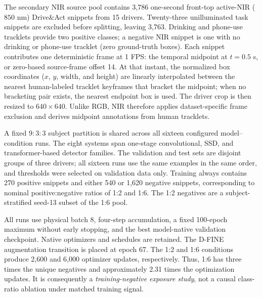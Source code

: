 \documentclass[conference]{IEEEtran}
\newcommand{\rev}[1]{{\color{blue}#1}}
\begin{document}
The secondary NIR source pool contains 3,786 one-second front-top active-NIR ($850$ nm) Drive\&Act snippets from 15 drivers. Twenty-three unilluminated task snippets are excluded before splitting, leaving 3,763. Drinking and phone-use tracklets provide two positive classes; \rev{a negative NIR snippet is one with no drinking or phone-use tracklet (zero ground-truth boxes)}. Each snippet contributes one deterministic frame at 1 FPS: the temporal midpoint at $t=0.5$ s, or zero-based source-frame offset 14. At that instant, the normalized box coordinates ($x$, $y$, width, and height) are linearly interpolated between the nearest human-labeled tracklet keyframes that bracket the midpoint; when no bracketing pair exists, the nearest endpoint box is used. The driver crop is then resized to $640\times640$. Unlike RGB, NIR therefore applies dataset-specific frame exclusion and derives midpoint annotations from human tracklets.

A fixed $9{:}3{:}3$ subject partition is shared across all sixteen configured model--condition runs. The eight systems span one-stage convolutional, SSD, and transformer-based detector families. \rev{The validation and test sets are disjoint groups of three drivers; all sixteen runs use the same examples in the same order, and thresholds were selected on validation data only.} Training always contains 270 positive snippets and either 540 or 1,620 negative snippets, corresponding to nominal positive:negative ratios of 1:2 and 1:6. The 1:2 negatives are a subject-stratified seed-13 subset of the 1:6 pool.

All runs use physical batch 8, four-step accumulation, a fixed 100-epoch maximum without early stopping, and the best model-native validation checkpoint. Native optimizers and schedules are retained. The D-FINE augmentation transition is placed at epoch 67. The 1:2 and 1:6 conditions produce 2,600 and 6,000 optimizer updates, respectively. Thus, 1:6 has three times the unique negatives and approximately 2.31 times the optimization updates. It is consequently a \emph{training-negative exposure study}, not a causal class-ratio ablation under matched training signal.
\end{document}
